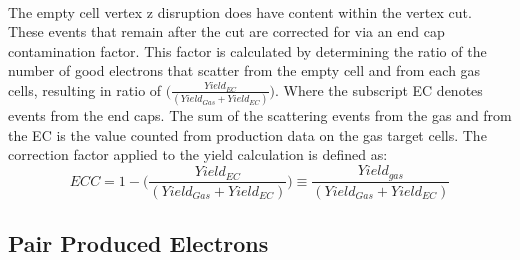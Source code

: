 \paragraph{}The empty cell vertex z disruption does have content within the vertex cut. These events that remain after the cut are corrected for via an end cap contamination factor. This  factor is calculated by determining the ratio of the number of good electrons that scatter from the empty cell and from each gas cells, resulting in ratio of $\big(\frac{Yield_{EC}}{(Yield_{Gas} + Yield_{EC})}\big)$. Where the subscript EC denotes events from the end caps. The sum of the scattering events from the gas and from the EC is the value counted from production data on the gas target cells. The correction factor applied to the yield calculation is defined as:
\begin{equation*}
ECC = 1- \big(\frac{Yield_{EC}}{(Yield_{Gas} + Yield_{EC})}\big) \equiv \frac{Yield_{gas}}{(Yield_{Gas} + Yield_{EC})}
\end{equation*}




\subsection{Pair Produced Electrons}
